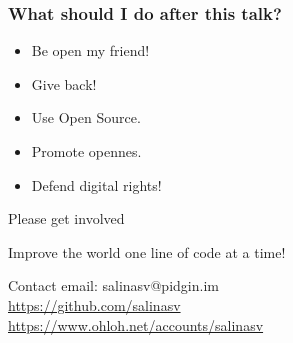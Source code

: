 \documentclass[hyperref={pdfpagelabels=false},xcolor=pst,pdf,fragile]{beamer}
\begin{document}
\begin{frame}
  \frametitle{What should I do after this talk?}

	  \begin{itemize}
		  \item Be open my friend!
			  \pause
		  \item Give back!
			  \pause
		  \item Use Open Source.
			  \pause
		  \item Promote opennes.
			  \pause
		  \item \alert{Defend digital rights!}
	  \end{itemize}

  \pause
  \begin{alertblock}{\begin{center}Please get involved\end{center}}
	  \begin{center}
		  Improve the world one line of code at a time!
	  \end{center}
  \end{alertblock}

  \pause
  \begin{block}{Contact}
	  email: salinasv@pidgin.im \\
	  \url{https://github.com/salinasv} \\
	  \url{https://www.ohloh.net/accounts/salinasv}
  \end{block}

\end{frame}
\end{document}
